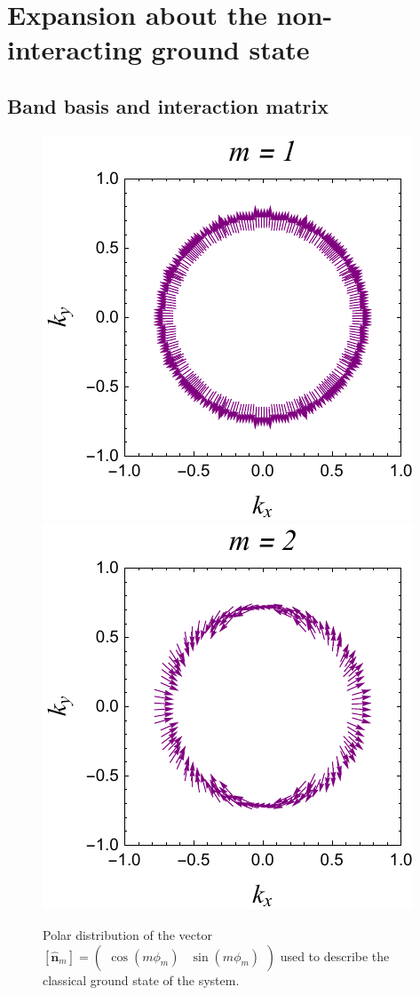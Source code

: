 \documentclass[english,aps,prd,nofootinbib,twocolumn]{revtex4-1}
\begin{document}
\section{Expansion about the non-interacting ground state}


\subsection{Band basis and interaction matrix}
\label{sect:Supp:Band-basis}

\begin{figure}
\centering
\includegraphics[scale=0.6]{1Layer.pdf}
\includegraphics[scale=0.6]{2Layer.pdf}
\caption{Polar distribution of the vector $[\hat{\mathbf{n}}_{m}]= 
\begin{pmatrix}
\cos(m\phi_{m})	&	\!\!\sin(m\phi_{m})
\end{pmatrix}$ used to describe the classical ground state of the system.}
\label{fig:Classical-gound-state}
\end{figure}
\end{document}
